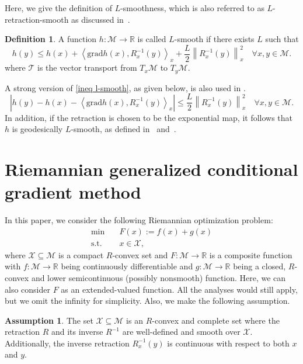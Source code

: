 \documentclass[pdflatex,sn-mathphys-num]{sn-jnl}%
\theoremstyle{definition} %
\newtheorem{definition}{Definition}[section] %
\newtheorem{assumption}{Assumption} %
\theoremstyle{remark} %
\newcommand{\grad}{\mathrm{grad}}
\begin{document}
Here, we give the definition of $L$-smoothness, which is also referred to as $L$-retraction-smooth as discussed in~\cite{huang_riemannian_2022}.
\begin{definition}
 A function $h \colon \mathcal{M} \rightarrow \mathbb{R}$ is called  $L$-smooth if there exists $L$ such that
\begin{equation}\label{ineq l-smooth}
    h(y) \leq h(x)+\left\langle\grad h(x), R^{-1}_{x}(y)\right\rangle_x +\frac{L}{2}\left\|{R}_x^{-1}(y)\right\|^2_x \quad \forall x, y \in \mathcal{M}.
\end{equation}
where $\mathcal{T}$ is the vector transport from $T_x \mathcal{M}$ to $T_y \mathcal{M}$. 
\end{definition}
A strong version of \eqref{ineq l-smooth}, as given below, is also used in \cite[Assumption 2.6]{boumal2019global}.
$$
|h(y) - h(x)-\left\langle\grad h(x), R^{-1}_{x}(y)\right\rangle_x |\leq \frac{L}{2}\left\|{R}_x^{-1}(y)\right\|^2_x \quad \forall x, y \in \mathcal{M}.
$$
In addition, if the retraction is chosen to be the exponential map, it follows that $h$ is geodesically $L$-smooth, as defined in~\cite{weber_riemannian_2023} and~\cite[Section 10.4]{Boumal_2023}.




\section{Riemannian generalized conditional gradient method}\label{sec3}

In this paper, we consider the following Riemannian optimization problem:
    \begin{equation}
    \label{eq:prob}
    \begin{aligned}
        \min & \quad F(x):= f(x)+ g(x) \\
        \mbox{s.t.} & \quad x \in \mathcal{X} ,
    \end{aligned}
    \end{equation}
where $\mathcal{X} \subseteq \mathcal{M}$ is a compact $R$-convex set and $F \colon \mathcal{M} \rightarrow \mathbb{R} $ is a composite function with $f\colon \mathcal{M} \rightarrow \mathbb{R}$ being continuously differentiable and $g\colon \mathcal{M} \rightarrow \mathbb{R}$ 
being a closed, $R$-convex and lower semicontinuous (possibly nonsmooth) function.
Here, we can also consider \( F \) as an extended-valued function. All the analyses would still apply, but we omit the infinity for simplicity.
Also, we make the following assumption.
\begin{assumption}\label{assum1}
    The set $\mathcal{X} \subseteq \mathcal{M}$ is an $R$-convex  and complete set where the retraction ${R}$ and its inverse ${R}^{-1}$ are well-defined and smooth over  $\mathcal{X}$. Additionally, the inverse retraction \( R^{-1}_x(y) \) is continuous with respect to both \( x \) and \( y \).
\end{assumption}
\end{document}
